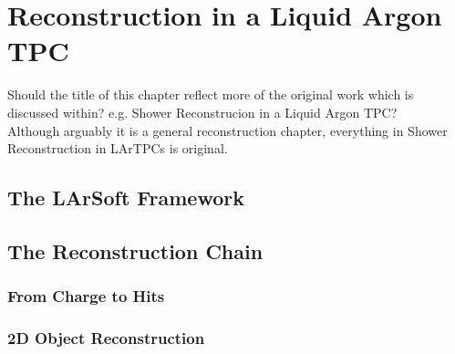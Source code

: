 
\chapter{Reconstruction in a Liquid Argon TPC}\label{chap:LArTPCReconstruction}

{\color{red} Should the title of this chapter reflect more of the original work which is discussed within?  e.g. Shower Reconstrucion in a Liquid Argon TPC?\\
Although arguably it is a general reconstruction chapter, everything in Shower Reconstruction in LArTPCs is original.}

\section{The LArSoft Framework}\label{sec:LArSoft}

\section{The Reconstruction Chain}\label{sec:ReconstructionChain}

\subsection{From Charge to Hits}\label{sec:HitReconstruction}

\subsection{2D Object Reconstruction}\label{sec:2DReconstruction}

